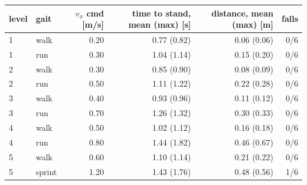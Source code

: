 \begin{tabular}{llrrrr}\toprule
level & gait & $v_x$ cmd [m/s] & time to stand, mean (max) [s] & distance, mean (max) [m] & falls \\\midrule
1 & walk & 0.20 & 0.77 (0.82) & 0.06 (0.06) & 0/6 \\
1 & run & 0.30 & 1.04 (1.14) & 0.15 (0.20) & 0/6 \\
2 & walk & 0.30 & 0.85 (0.90) & 0.08 (0.09) & 0/6 \\
2 & run & 0.50 & 1.11 (1.22) & 0.22 (0.28) & 0/6 \\
3 & walk & 0.40 & 0.93 (0.96) & 0.11 (0.12) & 0/6 \\
3 & run & 0.70 & 1.26 (1.32) & 0.30 (0.33) & 0/6 \\
4 & walk & 0.50 & 1.02 (1.12) & 0.16 (0.18) & 0/6 \\
4 & run & 0.80 & 1.44 (1.82) & 0.46 (0.67) & 0/6 \\
5 & walk & 0.60 & 1.10 (1.14) & 0.21 (0.22) & 0/6 \\
5 & sprint & 1.20 & 1.43 (1.76) & 0.48 (0.56) & 1/6 \\
\bottomrule\end{tabular}
